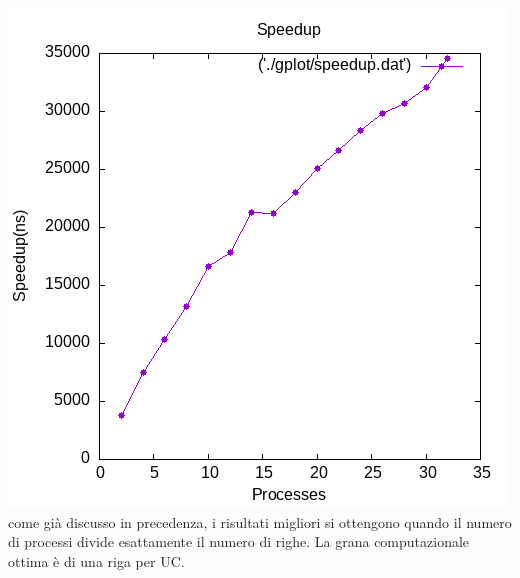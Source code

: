 \documentclass[twocolumn]{article}
\begin{document}
	\includegraphics[scale=0.5]{speedup.png}
	\\
	come già discusso in precedenza, i risultati migliori si ottengono quando il numero di processi divide esattamente il numero di righe. La grana computazionale ottima è di una riga per UC.
\end{document}
